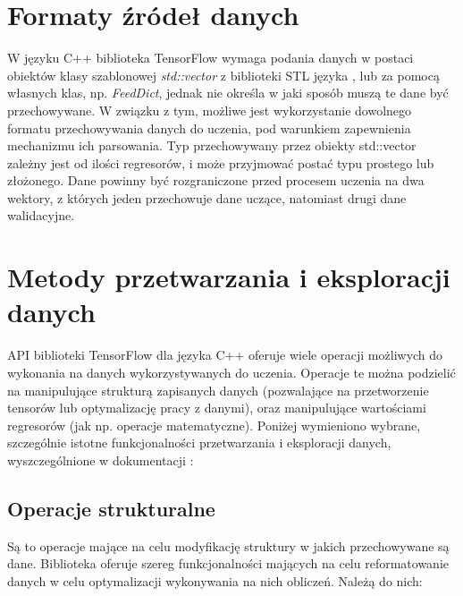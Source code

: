 
\section{Formaty źródeł danych}

W języku C++ biblioteka TensorFlow wymaga podania danych w postaci obiektów klasy szablonowej \textit{std::vector} z biblioteki STL języka \cite{input_tf}, lub za pomocą własnych klas, np. \textit{FeedDict}, jednak nie określa w jaki sposób muszą te dane być przechowywane. W związku z tym, możliwe jest wykorzystanie dowolnego formatu przechowywania danych do uczenia, pod warunkiem zapewnienia mechanizmu ich parsowania. Typ przechowywany przez obiekty std::vector zależny jest od ilości regresorów, i może przyjmować postać typu prostego lub złożonego. Dane powinny być rozgraniczone przed procesem uczenia na dwa wektory, z których jeden przechowuje dane uczące, natomiast drugi dane walidacyjne.


\section{Metody przetwarzania i eksploracji danych}

API biblioteki TensorFlow dla języka C++ oferuje wiele operacji możliwych do wykonania na danych wykorzystywanych do uczenia. Operacje te można podzielić na manipulujące strukturą zapisanych danych (pozwalające na przetworzenie tensorów lub optymalizację pracy z danymi), oraz manipulujące wartościami regresorów (jak np. operacje matematyczne). Poniżej wymieniono wybrane, szczególnie istotne funkcjonalności przetwarzania i eksploracji danych, wyszczególnione w dokumentacji \cite{tfcpp}:

\subsection{Operacje strukturalne}

Są to operacje mające na celu modyfikację struktury w jakich przechowywane są dane. Biblioteka oferuje szereg funkcjonalności mających na celu reformatowanie danych w celu optymalizacji wykonywania na nich obliczeń\cite{tfcpp}. Należą do nich:

